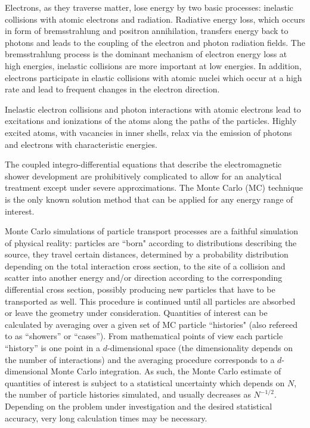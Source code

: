 Electrons, as they traverse matter, lose energy by two basic processes:
inelastic collisions with atomic electrons and radiation. 
Radiative energy loss, which occurs in form of bremsstrahlung and 
positron annihilation, transfers energy back to photons 
and leads to the coupling of the electron and photon 
radiation fields. The bremsstrahlung process is the dominant 
mechanism of electron energy loss at high energies, inelastic collisions  
are more important at low energies. 
In addition, electrons participate in elastic collisions with atomic 
nuclei which occur at a high rate and lead to frequent changes 
in the electron direction. 

Inelastic electron collisions and photon interactions with atomic electrons 
lead to excitations and ionizations of the atoms along the paths of 
the particles. Highly excited atoms, with vacancies in inner shells, 
relax via the emission of photons and electrons with 
characteristic energies. 

The coupled integro-differential equations 
that describe the electromagnetic shower development are 
prohibitively complicated to allow for an analytical treatment 
except under severe approximations. The Monte Carlo (MC) technique 
is the only known solution method that can be applied for 
any energy range of interest. 

Monte Carlo 
simulations of particle transport processes are a faithful simulation
of physical reality: particles are ``born" according to distributions
describing the source, they travel certain distances, determined by a
probability distribution depending on the total interaction
cross section, to the site of a collision and scatter into
another energy and/or direction according to the corresponding
differential cross section, possibly producing new 
particles that have to be transported as well. 
This procedure is continued until all particles are 
absorbed or leave the geometry under consideration.
Quantities of interest can be calculated by averaging over a given set of
MC particle ``histories" (also refereed to as ``showers'' or 
``cases''). From mathematical points of view each particle 
``history'' is one point in a $d$-dimensional space (the dimensionality 
depends on the number of interactions) and the averaging procedure 
corresponds to a $d$-dimensional Monte Carlo integration. 
As such, the Monte Carlo estimate of quantities of interest 
is subject to a 
statistical uncertainty which depends on 
$N$, the number of particle histories simulated,   
and usually decreases as $N^{-1/2}$. Depending on the 
problem under investigation and the desired statistical 
accuracy, very long calculation times may be necessary. 

